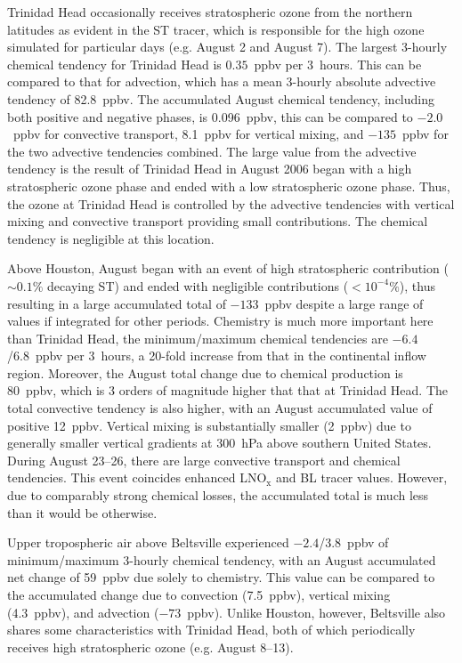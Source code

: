 Trinidad Head occasionally receives stratospheric ozone from the northern latitudes as evident in the ST tracer, which is
responsible for the high ozone simulated for particular days
(e.g. August 2 and August 7). The largest 3-hourly chemical tendency for Trinidad Head is
$0.35$~ppbv per 3~hours. This can be compared to that for advection, which has a mean
3-hourly absolute advective tendency of 82.8~ppbv. The accumulated August chemical
tendency, including both positive and negative phases, is 0.096~ppbv, this can be compared
to $-2.0$~ppbv for convective transport, 8.1~ppbv for vertical mixing, and $-135$~ppbv for
the two advective tendencies combined. The large value from the advective tendency
is the result of Trinidad Head in August 2006 began with a high stratospheric
ozone phase and ended with a low stratospheric ozone phase. Thus, the ozone at Trinidad Head is
controlled by the advective tendencies with vertical mixing and convective transport providing
small contributions. The chemical tendency is negligible at this location.

Above Houston, August began with an event of high stratospheric contribution ($\sim0.1\%$ decaying ST)
and ended with negligible contributions ($<10^{-4}\%$), thus resulting in a large accumulated total
of $-133$~ppbv despite a large range of values if integrated for other periods.
Chemistry is much more important here than Trinidad Head, the minimum/maximum chemical tendencies
are $-6.4$/6.8~ppbv per 3~hours, a 20-fold increase from that in the continental inflow region.
Moreover, the August total change due to chemical production is 80~ppbv, which is 3 orders
of magnitude higher that that at Trinidad Head. The total convective tendency is also higher, with an
August accumulated value of positive 12~ppbv. Vertical mixing is substantially smaller (2~ppbv)
due to generally smaller vertical gradients at 300~hPa above southern United States. During
August 23--26,  there are large convective transport and chemical tendencies. This event coincides
enhanced LNO$_{\mathrm{x}}$ and BL tracer values. However, due to comparably strong
chemical losses, the accumulated total is much less than it would be otherwise.

Upper tropospheric air above Beltsville experienced $-2.4$/3.8~ppbv of minimum/maximum 3-hourly chemical
tendency, with an August accumulated net change of 59~ppbv due solely to chemistry.
This value can be compared to the accumulated change due to convection
(7.5~ppbv), vertical mixing (4.3~ppbv), and advection ($-73$~ppbv). Unlike Houston, however,
Beltsville also shares some characteristics with Trinidad Head, both of which periodically
receives high stratospheric ozone (e.g. August 8--13).

